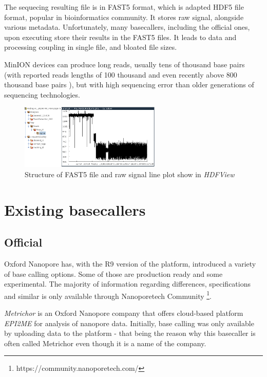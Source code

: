 \documentclass[times, utf8, diplomski, english]{fer}
\begin{document}
The sequecing resulting file is in FAST5 format, which is adapted HDF5 file format, popular in bioinformatics community. It stores raw signal, alongside various metadata. Unfortunately, many basecallers, including the official ones, upon executing store their results in the FAST5 files. It leads to data and processing coupling in single file, and bloated file sizes. 

MinION devices can produce long reads, usually tens of thousand base pairs (with reported reads lengths of 100 thousand \cite{loman1-100k} and even recently above 800 thousand base pairs \cite{loman2-800k}), but with high sequencing error than older generations of sequencing technologies.

\begin{figure}[!ht]
    \begin{center}
        \includegraphics[width=0.6\textwidth]{fast5_sample}
        \caption[Structure of FAST5 file and raw signal plot show in \textit{HDFView}]{Structure of FAST5 file and raw signal line plot show in \textit{HDFView} \protect\footnotemark}
        \label{fg:fast5}
    \end{center}
\end{figure}

  
\section{Existing basecallers}

\subsection{Official}
Oxford Nanopore has, with the R9 version of the platform, introduced a variety of base calling options. Some of those are production ready and some experimental. The majority of information regarding differences, specifications and similar is only available through Nanoporetech Community \footnote{https://community.nanoporetech.com/}.


\textit{Metrichor} is an Oxford Nanopore company that offers cloud-based platform \textit{EPI2ME} for analysis of nanopore data. 
Initially, base calling was only available by uploading data to the platform - that being the reason why this basecaller is often called Metrichor even though it is a name of the company.
\end{document}
